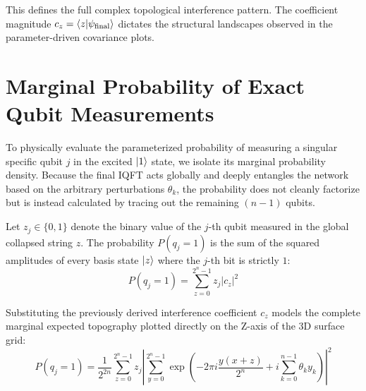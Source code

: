 \documentclass{article}
\begin{document}
This defines the full complex topological interference pattern. The coefficient magnitude $c_z = \braket{z | \psi_{\text{final}}}$ dictates the structural landscapes observed in the parameter-driven covariance plots.

\section{Marginal Probability of Exact Qubit Measurements}
To physically evaluate the parameterized probability of measuring a singular specific qubit $j$ in the excited $\ket{1}$ state, we isolate its marginal probability density. Because the final IQFT acts globally and deeply entangles the network based on the arbitrary perturbations $\theta_k$, the probability does not cleanly factorize but is instead calculated by tracing out the remaining $(n-1)$ qubits.

Let $z_j \in \{0, 1\}$ denote the binary value of the $j$-th qubit measured in the global collapsed string $z$. The probability $P(q_j = 1)$ is the sum of the squared amplitudes of every basis state $\ket{z}$ where the $j$-th bit is strictly $1$:
\begin{equation}
    P(q_j = 1) = \sum_{z=0}^{2^n-1} z_j \left| c_z \right|^2 
\end{equation}

Substituting the previously derived interference coefficient $c_z$ models the complete marginal expected topography plotted directly on the Z-axis of the 3D surface grid:
\begin{equation}
    P(q_j = 1) = \frac{1}{2^{2n}} \sum_{z=0}^{2^n-1} z_j \left| \sum_{y=0}^{2^n-1} \exp\left(-2\pi i \frac{y(x + z)}{2^n} + i \sum_{k=0}^{n-1} \theta_k y_k \right) \right|^2
\end{equation}
\end{document}
